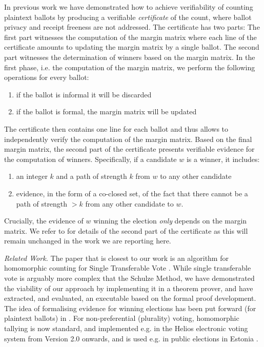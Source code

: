 \documentclass{llncs}
\begin{document}
  In previous work \cite{Pattinson:2017:SVE} we have demonstrated
  how to achieve verifiability of counting plaintext ballots by
  producing a verifiable \emph{certificate} of the count, where
  ballot privacy and receipt freeness are not addressed. The
  certificate has two parts: The first part witnesses the
  computation of the margin matrix where each line of the
  certificate amounts to updating the margin matrix by a single
  ballot. The second part witnesses the determination of winners
  based on the margin matrix. In the first phase, i.e. the
  computation of the margin matrix, we perform the following
  operations for every ballot:
  \begin{enumerate}
    \item if the ballot is informal it will be discarded
    \item if the ballot is formal, the margin matrix will be
    updated
  \end{enumerate}
  The certificate then contains one line for each ballot and thus
  allows to independently verify the computation of the margin
  matrix. Based on the final margin matrix, the second part of
  the certificate presents verifiable evidence for the computation
  of winners. Specifically, if a candidate $w$ is a winner, it
  includes:
  \begin{enumerate}
    \item an integer $k$ and a path of strength $k$ from $w$ to any
    other candidate
    \item evidence, in the form of a co-closed set, of the fact that
    there cannot be a path of strength $> k$ from any other
    candidate to $w$.
  \end{enumerate}
  Crucially, the evidence of $w$ winning the election \emph{only}
  depends on the margin matrix. 
  We refer to \cite{Pattinson:2017:SVE} for details of the second
  part of the certificate as this will remain unchanged in the work
  we are reporting here.
    
   
\smallskip\noindent\emph{Related Work.} The paper that is closest to
our work is an algorithm for homomorphic counting for Single
Transferable Vote \cite{Benaloh:2009:SSC}. While single transferable
vote is arguably more complex that the Schulze Method, we have
demonstrated the viability of our approach by implementing it in a
theorem prover, and have extracted, and evaluated, an executable
based on the formal proof development. The idea of formalising
evidence for winning elections has been put forward (for plaintext
ballots) in \cite{Pattinson:2015:VCM}. For non-preferential
(plurality) voting, homomorphic tallying is now standard, and
implemented e.g. in the Helios electronic voting system
\cite{deMarneffe:2009:EUP} from Version 2.0 onwards, and is used
e.g. in public elections in Estonia \cite{Parsovs:2016:HTE}.
\end{document}
